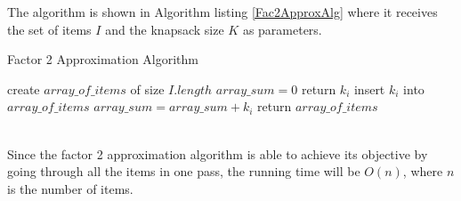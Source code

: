 \documentclass[paper=a4, fontsize=11pt]{scrartcl} %
\numberwithin{equation}{section} %
\numberwithin{figure}{section} %
\numberwithin{table}{section} %
\begin{document}
\begin{enumerate}
The algorithm is shown in Algorithm listing \ref{Fac2ApproxAlg} where it receives the set of items $I$ and the knapsack size $K$ as parameters.

\begin{minipage}{\linewidth}
  \begin{algorithm}[H]
    \caption{Factor 2 Approximation Algorithm}\label{Fac2ApproxAlg}
    \begin{algorithmic}[1]
        \State create $array\_of\_items$ of size $I.length$
        \State $array\_sum = 0$
		  \State return $k_i$
		  \State insert $k_i$ into $array\_of\_items$
		  \State $array\_sum = array\_sum + k_i$
		    \State return $array\_of\_items$
		  \EndIf
		\EndIf 
	\EndFor
      \EndProcedure
    \end{algorithmic}
  \end{algorithm}
\end{minipage}\\

Since the factor 2 approximation algorithm is able to achieve its objective by going through all the items in one pass, the running time will be $O(n)$, where $n$ is the number of items.

\end{enumerate}

\end{document}
